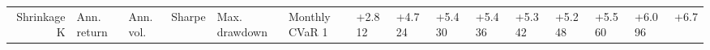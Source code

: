 \begin{tabular}{rlllllll}
\toprule
Shrinkage K & Ann. return & Ann. vol. & Sharpe & Max. drawdown & Monthly CVaR 1%
 & +2.8%
12 & +4.7%
24 & +5.4%
30 & +5.4%
36 & +5.3%
42 & +5.2%
48 & +5.5%
60 & +6.0%
96 & +6.7%
\bottomrule
\end{tabular}
